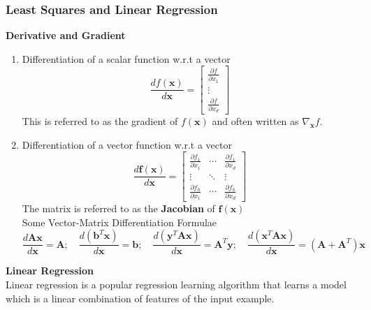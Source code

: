 \subsubsection{Least Squares and Linear Regression}
\textbf{Derivative and Gradient}
\begin{enumerate}
    \item Differentiation of a scalar function w.r.t a vector
    \[\frac{d f(\mathbf{x})}{d \mathbf{x}} =\begin{bmatrix}\frac{\partial f}{\partial x_1} \\\vdots \\\frac{\partial f}{\partial x_d}\end{bmatrix}\]
    This is referred to as the gradient of $f(\mathbf{x})$ and often written as $\nabla_{\mathbf{x}}f$.
    \item Differentiation of a vector function w.r.t a vector
    \[\frac{d \mathbf{f}(\mathbf{x})}{d \mathbf{x}} =
    \begin{bmatrix}
    \frac{\partial f_1}{\partial x_1} & \cdots & \frac{\partial f_1}{\partial x_d} \\
    \vdots & \ddots & \vdots \\
    \frac{\partial f_h}{\partial x_1} & \cdots & \frac{\partial f_h}{\partial x_d}
    \end{bmatrix}\]
    The matrix is referred to as the \textbf{Jacobian} of $\mathbf{f(x)}$ \\
    Some Vector-Matrix Differentiation Formulae \\
    \[\frac{d\mathbf{Ax}}{d\mathbf{x}}=\mathbf{A}; \quad \frac{d(\mathbf{b}^T\mathbf{x})}{d\mathbf{x}}=\mathbf{b};\quad \frac{d(\mathbf{y}^T\mathbf{Ax})}{d\mathbf{x}}=\mathbf{A}^T\mathbf{y};\quad \frac{d(\mathbf{x}^T\mathbf{Ax})}{d\mathbf{x}}=(\mathbf{A}+\mathbf{A}^T)\mathbf{x}\]
\end{enumerate}
\textbf{Linear Regression} \\
Linear regression is a popular regression learning algorithm that learns a model which is a linear combination of features of the input example.
